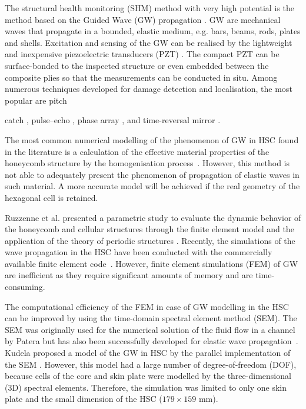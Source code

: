 \documentclass[materials,article,submit,moreauthors,pdftex]{Definitions/mdpi}
\begin{document}
The structural health monitoring (SHM) method with very high potential is the method based on the Guided Wave (GW) propagation \cite{mustapha2011assessment, sikdar2016guided, sikdar2016ultrasonic,radzienski2016assessment, yu2019core}.
GW are mechanical waves that propagate in a bounded, elastic medium, e.g. bars, beams, rods, plates and shells.
Excitation and sensing of the GW can be realised by the lightweight and inexpensive piezoelectric transducers (PZT) \cite{giurgiutiumicromechatronics}.
The compact PZT can be surface-bonded to the inspected structure or even embedded between the composite plies so that the measurements can be conducted in situ.
Among numerous techniques developed for damage detection and localisation, the most popular are pitch{catch \cite{ihn2008pitch, sikdar2017structural}, pulse--echo \cite{guo1993interaction, kudela2008damage}, phase array \cite{lu2006crack, ostachowicz2008elastic}, and time-reversal mirror \cite{fink1992time, eremin2016analytically}.
	
The most common numerical modelling of the phenomenon of GW in HSC found in the literature is a calculation of the effective material properties of the honeycomb structure by the homogenisation process~\cite{shi1995derivation, qi2008ultrasonic, mustapha2014leaky, baid2015dispersion, sikdar2016guided}.
However, this method is not able to adequately present the phenomenon of propagation of elastic waves in such material.
A more accurate model will be achieved if the real geometry of the hexagonal cell is retained.
	
Ruzzenne et al. presented a parametric study to evaluate the dynamic behavior of the honeycomb and cellular structures through the finite element model and the application of the theory of periodic structures \cite{ruzzene2003wave}.
Recently, the simulations of the wave propagation in the HSC have been conducted with the commercially available finite element code~\cite{song2009guided, hosseini2013numerical, tian2015wavenumber, zhao2018wave}.
However, finite element simulations (FEM) of GW are inefficient as they require significant amounts of memory and are time-consuming.

The computational efficiency of the FEM in case of GW modelling in the HSC can be improved by using the time-domain spectral element method (SEM).
The SEM was originally used for the numerical solution of the fluid flow in a channel by Patera \cite{patera1984spectral} but has also been successfully developed for elastic wave propagation~\cite{ostachowicz2011guided}.
Kudela proposed a model of the GW in HSC by the parallel implementation of the SEM \cite{kudela2016parallel}.
However, this model had a large number of degree-of-freedom (DOF), because cells of the core and skin plate were modelled by the three-dimensional (3D) spectral elements.
Therefore, the simulation was limited to only one skin plate and the small dimension of the HSC (\(179 \times 159 \) mm).

}
\end{document}
